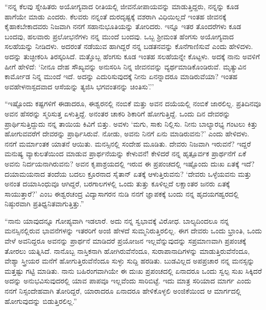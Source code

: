 “ನನ್ನ ಕೆಲವು ಸ್ನೇಹಿತರು ಅಯೋಗ್ಯವಾದ ರೀತಿಯಲ್ಲಿ ಜೀವನೋಪಾಯವನ್ನು ಮಾಡುತ್ತಿದ್ದರು, ನನ್ನನ್ನು ಕೂಡ ಹಾಗೆಯೇ ಮಾಡು ಎಂದರು. ಕೆಲವರು ನನ್ನಂತೆ ದುರದೃಷ್ಟಕ್ಕೆ ವಶರಾಗಿ ವಿಧಿಯಿಲ್ಲದೆ ಇಂತಹ ಜೀವನಕ್ಕೆ ಕೈಹಾಕಬೇಕಾದವರು ನಿಜವಾಗಿ ನನಗೆ ಸಹಾನುಭೂತಿಯನ್ನು ತೋರಿದರು. ಇನ್ನೂ ಇತರ ತೊಂದರೆಗಳು ಕೂಡ ಬಂದವು, ಹಲವಾರು ಪ್ರಲೋಭನೆಗಳು ನನ್ನ ಮುಂದೆ ಬಂದವು. ಒಬ್ಬ ಶ‍್ರೀಮಂತ ಹೆಂಗಸು ಅಯೋಗ್ಯವಾದ ಸಲಹೆಯನ್ನು ನೀಡಿದಳು. ಅದರಂತೆ ನಡೆಯುವ ಹಾಗಿದ್ದರೆ ನನ್ನ ಬಡತನವನ್ನು ಕೊನೆಗಾಣಿಸುವೆ ಎಂದು ಹೇಳಿದಳು. ಅದನ್ನು ತುಚ್ಛೀಕರಿಸಿ ತಿರಸ್ಕರಿಸಿದೆ. ಮತ್ತೊಬ್ಬ ಹೆಂಗಸು ಕೂಡ ಇಂತಹ ಸಲಹೆಯನ್ನೇ ಕೊಟ್ಟಳು. ಅದಕ್ಕೆ ನಾನು ಅವಳಿಗೆ ಹೀಗೆ ಹೇಳಿದೆ: ‘ನೀನೂ ದೇಹ ಸೌಖ್ಯವನ್ನು ಅನುಸರಿಸಿ ನಿನ್ನ ಜೀವನವನ್ನು ವ್ಯರ್ಥಮಾಡಿಕೊಂಡಿರುವೆ. ಮೃತ್ಯುವಿನ ಕಾರ್ಮೋಡ ನಿನ್ನ ಮುಂದೆ ಇದೆ. ಅದನ್ನು ಎದುರಿಸುವುದಕ್ಕೆ ನೀನು ಏನನ್ನಾದರೂ ಮಾಡಿರುವೆಯಾ? ಇಂತಹ ಅವಹೇಳನಾಸ್ಪದವಾದ ಆಸೆಯನ್ನು ತ್ಯಜಿಸಿ ಭಗವಂತನನ್ನು ಚಿಂತಿಸು’.’’

“ಇಷ್ಟೊಂದು ಕಷ್ಟಗಳಿಗೆ ಈಡಾದರೂ, ಈಶ್ವರನಲ್ಲಿ ನಂಬಿಕೆ ಮತ್ತು ಅವನ ದಯೆಯಲ್ಲಿ ನಂಬಿಕೆ ಜಾರಲಿಲ್ಲ. ಪ್ರತಿದಿನವೂ ಅವನ ಹೆಸರನ್ನು ಸ್ಮರಿಸುತ್ತ ಏಳುತ್ತಿದ್ದೆ. ಅನಂತರ ಚಾಕರಿ ಶಿಕಾರಿಗೆ ಹೋಗುತ್ತಿದ್ದೆ. ಒಂದು ದಿನ ದೇವರನ್ನು ಪ್ರಾರ್ಥಿಸುತ್ತಿದ್ದುದು ನನ್ನ ತಾಯಿಯ ಕಿವಿಗೆ ಬಿತ್ತು. ಅವಳು ‘ಮಗು, ಸಾಕು ನಿಲ್ಲಿಸು. ನೀನು ಬಾಲ್ಯಾರಭ್ಯ ಗಂಟಲು ಕಿತ್ತು ಹೋಗುವವರೆಗೆ ದೇವರನ್ನು ಪ್ರಾರ್ಥಿಸಿರುವೆ. ನೋಡು, ಅವನು ನಿನಗೆ ಏನು ಮಾಡಿರುವನು?’ ಎಂದು ಹೇಳಿದಳು. ನನಗೆ ಮರ್ಮಾಂತಕ ಯಾತನೆ ಆಯಿತು. ಮನಸ್ಸಿನಲ್ಲಿ ಸಂದೇಹ ಮೂಡಿತು. ದೇವರು ನಿಜವಾಗಿ ಇರುವನೆ? ಇದ್ದರೆ ಮನುಷ್ಯ ವ್ಯಾಕುಲತೆಯಿಂದ ಮಾಡುವ ಪ್ರಾರ್ಥನೆಯನ್ನು ಕೇಳುವನೆ! ಕೇಳಿದರೆ ನನ್ನ ಹೃತ್ಪೂರ್ವಕ ಪ್ರಾರ್ಥನೆಗೆ ಏಕೆ ಅವನು ನಿರ್ದಯನಾಗಿರುವನು? ಅವನ ಕೃಪಾಶ್ರಯದಲ್ಲಿ ಇರುವ ಈ ಪ್ರಪಂಚದಲ್ಲಿ ಇಷ್ಟೊಂದು ದುಃಖ ಏತಕ್ಕೆ ಇದೆ? ದಯಾಮಯನಾದ ತಂದೆಯ ಬದಲು ಕ್ರೂರನಾದ ಸೈತಾನ್ ಏತಕ್ಕೆ ಆಳುತ್ತಿರುವನು? ‘ದೇವರು ಒಳ್ಳೆಯವನು ಮತ್ತು ಅನಂತ ದಯಾಸಿಂಧುವೂ ಆಗಿದ್ದರೆ, ಬರಗಾಲಗಳಲ್ಲಿ ಒಂದು ತುತ್ತು ಕೂಳಿಲ್ಲದೆ ಲಕ್ಷಾಂತರ ಜನರು ಏತಕ್ಕೆ ಸಾಯುತ್ತಾರೆ?’ ಎಂಬ ಈಶ್ವರಚಂದ್ರ ವಿದ್ಯಾಸಾಗರನ ನುಡಿ ನನಗೆ ಜ್ಞಾಪಕಕ್ಕೆ ಬಂದು ನನ್ನ ಹೃದಯಗಹ್ವರದಲ್ಲಿ ನಿಷ್ಠುರವಾಗಿ ಪ್ರತಿಧ್ವನಿತವಾಗುತ್ತಿತ್ತು.”

“ನಾನು ಯಾವುದನ್ನೂ ಗೋಪ್ಯವಾಗಿ ಇಡಲಾರೆ. ಅದು ನನ್ನ ಸ್ವಭಾವಕ್ಕೆ ವಿರೋಧ. ಬಾಲ್ಯದಿಂದಲೂ ನನ್ನ ಮನಸ್ಸಿನಲ್ಲಿರುವ ಭಾವನೆಗಳನ್ನು ಇತರರಿಗೆ ಅಂಜಿ ಹೇಳದೆ ಸುಮ್ಮನಿರುತ್ತಿರಲಿಲ್ಲ. ಈಗ ದೇವರು ಒಂದು ಭ್ರಾಂತಿ, ಒಂದು ವೇಳೆ ಅವನಿದ್ದರೂ ಅವನನ್ನು ಪ್ರಾರ್ಥನೆ ಮಾಡಿದರೆ ಪ್ರಯೋಜನ ಇಲ್ಲವೆನ್ನುವುದನ್ನು ಸಪ್ರಮಾಣವಾಗಿ ಪ್ರಪಂಚಕ್ಕೆ ತೋರಲು ಯತ್ನಿಸಿದೆ. ನಾನೊಬ್ಬ ನಾಸ್ತಿಕನಾಗಿ ಹೋಗಿರುವೆನೆಂದೂ, ಸುರಾಪಾನಾದಿಗಳನ್ನು ಮಾಡುತ್ತಿರುವೆನೆಂದೂ, ವೇಶ್ಯಾ ಸ್ತ್ರೀಯರ ಮನೆಗೆ ಹೋಗುತ್ತಿರುವೆನೆಂದೂ ಸುಳ್ಳು ಸುದ್ದಿ ಹರಡಿತು. ಬುಡವಿಲ್ಲದ ಅಪಪ್ರಚಾರ ನನ್ನ ಮನಸ್ಸನ್ನು ಮತ್ತಷ್ಟು ಗಟ್ಟಿ ಮಾಡಿತು. ನಾನು ಬಹಿರಂಗವಾಗಿಯೇ ಈ ದುಃಖ ಪ್ರಪಂಚದಲ್ಲಿ ಏನಾದರೂ ಒಂದು ಸ್ವಲ್ಪ ಸುಖ ಸಿಕ್ಕಿದರೆ ಅದನ್ನು ಅನುಭವಿಸುವುದರಲ್ಲಿ ಯಾವ ಪಾಪವೂ ಇಲ್ಲವೆಂದು ಸಾರಿಬಿಟ್ಟೆ. ಇದು ಮಾತ್ರ ಸರಿಯಾದ ಮಾರ್ಗ ಎಂದು ನನಗೆ ನಿಸ್ಸಂದೇಹವಾಗಿ ತೋರಿದ್ದರೆ, ಯಾರಾದರೂ ಏನಾದರೂ ಹೇಳಿಕೊಳ್ಳಲಿ ಅಂಜಿಕೆಯಿಂದ ಆ ಮಾರ್ಗದಲ್ಲಿ ಹೋಗುವುದನ್ನು ಬಿಡುತ್ತಿರಲಿಲ್ಲ.”

